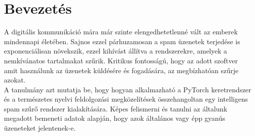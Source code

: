 ﻿\section{Bevezetés}
A digitális kommunikáció mára már szinte elengedhetetlenné vált az emberek mindennapi életében. Sajnos ezzel párhuzamosan a spam üzenetek terjedése is exponenciálisan növekszik, ezzel kihívást állítva a rendszerekre, amelyek a nemkívánatos tartalmakat szűrik. Kritikus fontosságú, hogy az adott szoftver amit használunk az üzenetek küldésére és fogadására, az megbízhatóan szűrje azokat. \\

A tanulmány azt mutatja be, hogy hogyan alkalmazható a PyTorch keretrendszer és a természetes nyelvi feldolgozási megközelítések összehangoltan egy intelligens spam szűrő rendszer kialakítására. Képes felismerni és tanulni az általunk megadott bemeneti adatok alapján, hogy azok általános vagy épp gyanús üzeneteket jelentenek-e.